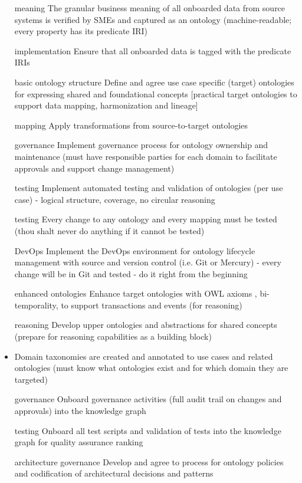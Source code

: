 \begin{itemize}[leftmargin=1.5in]

  \item [meaning] The granular business meaning of all onboarded data from source systems is verified by SMEs and captured as an ontology (machine-readable; every property has its predicate IRI)
  \item [implementation] Ensure that all onboarded data is tagged with the predicate IRIs
  \item [basic ontology structure] Define and agree use case specific (target) ontologies for expressing shared and foundational concepts [practical target ontologies to support data mapping, harmonization and lineage]
  \item [mapping] Apply transformations from source-to-target ontologies
  \item [governance] Implement governance process for ontology ownership and maintenance (must have responsible parties for each domain to facilitate approvals and support change management)
  \item [testing] Implement automated testing and validation of ontologies (per use case) - logical structure, coverage, no circular reasoning
  \item [testing] Every change to any ontology and every mapping must be tested (thou shalt never do anything if it cannot be tested)
  \item [DevOps] Implement the DevOps environment for ontology lifecycle management with source and version control (i.e. Git or Mercury) - every change will be in Git and tested - do it right from the beginning

\end{itemize}

\kgmmscoringlevelTwo

\begin{itemize}[leftmargin=1.5in]

  \item [enhanced ontologies] Enhance target ontologies with OWL axioms , bi-temporality, to support transactions and events (for reasoning)
  \item [reasoning] Develop upper ontologies and abstractions for shared concepts (prepare for reasoning capabilities as a building block)
  \item Domain taxonomies are created and annotated to use cases and related ontologies (must know what ontologies exist and for which domain they are targeted)
  \item [governance] Onboard governance activities (full audit trail on changes and approvals) into the knowledge graph
  \item [testing] Onboard all test scripts and validation of tests into the knowledge graph for quality assurance ranking
  \item [architecture governance] Develop and agree to process for ontology policies and codification of architectural decisions and patterns

\end{itemize}

\kgmmscoringlevelThree




